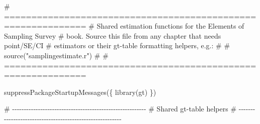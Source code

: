 \documentclass[
  letterpaper,
  DIV=11,
  numbers=noendperiod]{scrreprt}
\newenvironment{Shaded}{\begin{snugshade}}{\end{snugshade}}
\newcommand{\CommentTok}[1]{\textcolor[rgb]{0.37,0.37,0.37}{#1}}
\newcommand{\FunctionTok}[1]{\textcolor[rgb]{0.28,0.35,0.67}{#1}}
\newcommand{\NormalTok}[1]{\textcolor[rgb]{0.00,0.23,0.31}{#1}}
\renewcommand{\[}{\begin{equation}}
\renewcommand{\]}{\end{equation}}
\begin{document}
\begin{Shaded}
\begin{Highlighting}[]
\CommentTok{\# =============================================================}
\CommentTok{\# Shared estimation functions for the Elements of Sampling Survey}
\CommentTok{\# book. Source this file from any chapter that needs point/SE/CI}
\CommentTok{\# estimators or their gt{-}table formatting helpers, e.g.:}
\CommentTok{\#}
\CommentTok{\#   source("samplingestimate.r")}
\CommentTok{\#}
\CommentTok{\# =============================================================}

\FunctionTok{suppressPackageStartupMessages}\NormalTok{(\{}
    \FunctionTok{library}\NormalTok{(gt)}
\NormalTok{\})}

\CommentTok{\# {-}{-}{-}{-}{-}{-}{-}{-}{-}{-}{-}{-}{-}{-}{-}{-}{-}{-}{-}{-}{-}{-}{-}{-}{-}{-}{-}{-}{-}{-}{-}{-}{-}{-}{-}{-}{-}{-}{-}{-}{-}{-}{-}{-}{-}{-}{-}{-}{-}{-}{-}{-}{-}{-}{-}{-}{-}}
\CommentTok{\# Shared gt{-}table helpers}
\CommentTok{\# {-}{-}{-}{-}{-}{-}{-}{-}{-}{-}{-}{-}{-}{-}{-}{-}{-}{-}{-}{-}{-}{-}{-}{-}{-}{-}{-}{-}{-}{-}{-}{-}{-}{-}{-}{-}{-}{-}{-}{-}{-}{-}{-}{-}{-}{-}{-}{-}{-}{-}{-}{-}{-}{-}{-}{-}{-}}


\end{Highlighting}
\end{Shaded}
\end{document}
